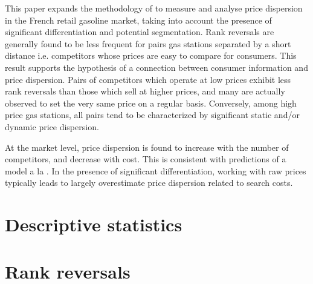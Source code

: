 \documentclass[english]{article}
\begin{document}
This paper expands the methodology of \cite{TAP11} to measure and analyse price dispersion in the French retail gasoline market, taking into account the presence of significant differentiation and potential segmentation. Rank reversals are generally found to be less frequent for pairs gas stations separated by a short distance i.e. competitors whose prices are easy to compare for consumers. This result supports the hypothesis of a connection between consumer information and price dispersion. Pairs of competitors which operate at low prices exhibit less rank reversals than those which sell at higher prices, and many are actually observed to set the very same price on a regular basis. Conversely, among high price gas stations, all pairs tend to be characterized by significant static and/or dynamic price dispersion.

At the market level, price dispersion is found to increase with the number of competitors, and decrease with cost. This is consistent with predictions of a model a la \cite{VAR80}. In the presence of significant differentiation, working with raw prices typically leads to largely overestimate price dispersion related to search costs.


\newpage


\newpage

\appendix

\section{Descriptive statistics}



\newpage

\section{Rank reversals}
\end{document}
